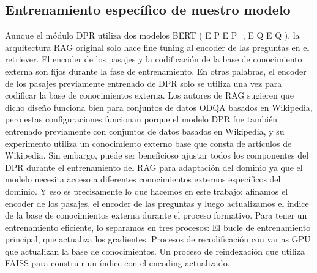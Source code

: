 \documentclass{article}
\begin{document}
\subsection{Entrenamiento específico de nuestro modelo}
Aunque el módulo DPR utiliza dos modelos BERT (
E
P
E 
P
​
 , 
E
Q
E 
Q
​
 ), la arquitectura RAG original solo hace fine tuning al encoder de las preguntas en el retriever. El encoder de los pasajes y la codificación de la base de conocimiento externa son fijos durante la fase de entrenamiento. En otras palabras, el encoder de los pasajes previamente entrenado de DPR solo se utiliza una vez para codificar la base de conocimientos externa. Los autores de RAG sugieren que dicho diseño funciona bien para conjuntos de datos ODQA basados en Wikipedia, pero estas configuraciones funcionan porque el modelo DPR fue también entrenado previamente con conjuntos de datos basados en Wikipedia, y su experimento utiliza un conocimiento externo base que consta de artículos de Wikipedia. Sin embargo, puede ser beneficioso ajustar todos los componentes del DPR durante el entrenamiento del RAG para adaptación del dominio ya que el modelo necesita acceso a diferentes conocimientos externos específicos del dominio. Y eso es precisamente lo que hacemos en este trabajo: afinamos el encoder de los pasajes, el encoder de las preguntas y luego actualizamos el índice de la base de conocimientos externa durante el proceso formativo.
Para tener un entrenamiento eficiente, lo separamos en tres procesos:
El bucle de entrenamiento principal, que actualiza los gradientes.
Procesos de recodificación con varias GPU que actualizan la base de conocimientos.
Un proceso de reindexación que utiliza FAISS para construir un índice con el encoding actualizado.
\end{document}
